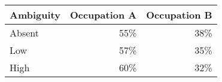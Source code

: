 \documentclass{beamer} %
\begin{document}
\begin{frame}[noframenumbering]\begin{center}
\begin{table}
\begin{center}
\begin{threeparttable}
  \begin{tabular}{lrr}\toprule
  Ambiguity      & Occupation A & Occupation B \\\midrule
  Absent & 55\% & 38\% \\
  Low    & 57\% & 35\% \\
  High   & 60\% & 32\% \\
  \bottomrule
  \end{tabular}
  \end{threeparttable}
  \end{center}
\end{table}
\end{center}\end{frame}
\end{document}
